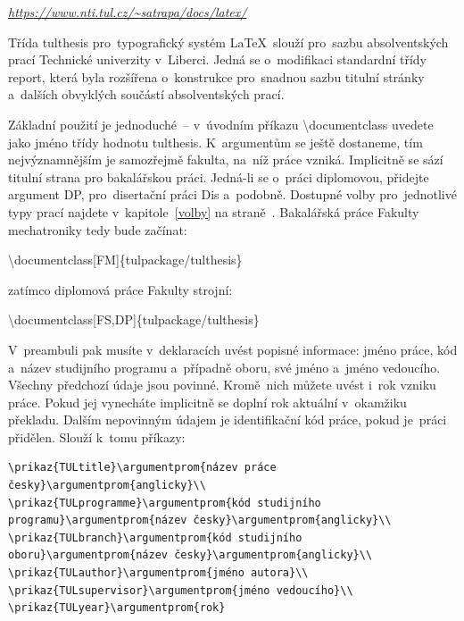 \documentclass[a4paper,11pt,fonts,numbering,twoside,margins,listingsleft]{./tulpackage/tulthesis}
\makeatletter
\newcommand{\argument}[1]{{\ttfamily\color{\tulcolor}#1}}
\newcommand{\argumentprom}[1]{\argument{\{\emph{#1}\}}}
\newcommand{\argumentindex}[1]{\argument{#1}\index{#1}}
\newcommand{\prikazneindex}[1]{\argument{\textbackslash{}#1}}
\newcommand{\prikaz}[1]{\prikazneindex{#1}\index{#1@\textbackslash #1}}
\makeatother
\begin{document}
\begin{tulquote}
    \href{https://www.nti.tul.cz/~satrapa/docs/latex/}{\emph{https://www.nti.tul.cz/\textasciitilde satrapa/docs/latex/}}
\end{tulquote}

Třída \argumentindex{tulthesis} pro~typografický systém \LaTeX\ slouží pro~sazbu
absolventských prací Technické univerzity v~Liberci. Jedná se o~modifikaci
standardní třídy \argument{report}, která byla rozšířena o~konstrukce pro~snadnou
sazbu titulní stránky a~dalších obvyklých součástí absolventských prací.

Základní použití je jednoduché~-- v~úvodním příkazu
\prikazneindex{documentclass} uvedete jako jméno třídy hodnotu
\argument{tulthesis}. K~argumentům se ještě dostaneme, tím nejvýznamnějším je
samozřejmě fakulta, na~níž práce vzniká. Implicitně se sází titulní strana pro
bakalářskou práci. Jedná-li se o~práci diplomovou, přidejte argument
\argument{DP}, pro~disertační práci \argument{Dis} a~podobně. Dostupné volby
pro~jednotlivé typy prací najdete v~kapitole~\ref{volby} na
straně~\pageref{volby}. Bakalářská práce Fakulty mechatroniky tedy bude
začínat:

\begin{listing}
    \prikazneindex{documentclass[FM]\{tulpackage/tulthesis\}}
\end{listing}

zatímco diplomová práce Fakulty strojní:

\begin{listing}
    \prikazneindex{documentclass[FS,DP]\{tulpackage/tulthesis\}}
\end{listing}

\clearpage

V~preambuli pak musíte v~deklaracích uvést popisné informace: jméno práce, kód
a~název studijního programu a~případně oboru, své jméno a~jméno vedoucího. Všechny
předchozí údaje jsou povinné. Kromě~nich můžete uvést i~rok vzniku práce. Pokud
jej vynecháte implicitně se doplní rok aktuální v~okamžiku překladu. Dalším
nepovinným údajem je identifikační kód práce, pokud je~práci přidělen. Slouží
k~tomu příkazy:

\begin{slisting}
\begin{verbatim}
\prikaz{TULtitle}\argumentprom{název práce česky}\argumentprom{anglicky}\\
\prikaz{TULprogramme}\argumentprom{kód studijního programu}\argumentprom{název česky}\argumentprom{anglicky}\\
\prikaz{TULbranch}\argumentprom{kód studijního oboru}\argumentprom{název česky}\argumentprom{anglicky}\\
\prikaz{TULauthor}\argumentprom{jméno autora}\\
\prikaz{TULsupervisor}\argumentprom{jméno vedoucího}\\
\prikaz{TULyear}\argumentprom{rok}
\end{verbatim}
\end{slisting}
\end{document}
